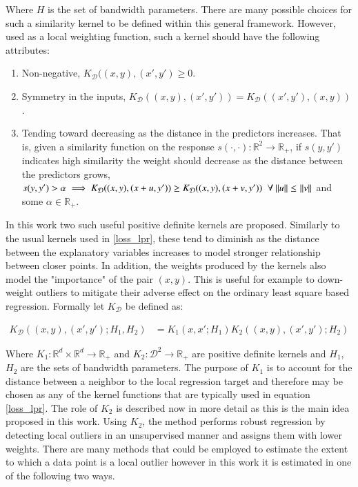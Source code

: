 \documentclass[preprint,1p,times]{elsarticle}
\begin{document}
Where $H$ is the set of bandwidth parameters. There are many possible choices for such a similarity kernel to be defined within this general framework. However, used as a local weighting function, such a kernel should have the following attributes:
\begin{enumerate}
\item Non-negative, $K_{\mathcal{D}}((x,y) , ( x', y') \geq 0$.
\item Symmetry in the inputs, $K_{\mathcal{D}}((x,y) , ( x', y')) = K_{\mathcal{D}}((x', y') , (x,y))$.
\item Tending toward decreasing as the distance in the predictors increases. That is, given  a similarity function on the response $s(\cdot, \cdot): \mathbb{R}^2 \rightarrow \mathbb{R}_+$, if $s(y, y')$ indicates high similarity the weight should decrease as the distance between the predictors grows, $s(y, y') > \alpha \implies       
K_{\mathcal{D}}((x, y) , ( x + u, y')) \geq K_{\mathcal{D}}((x, y) , (x + v, y')) \; \; \forall \: \norm{u} \leq \: \norm{v}$ and some $\alpha \in \mathbb{R}_+$.
\end{enumerate}

In this work two such useful positive definite kernels are proposed. Similarly to the usual kernels used in \eqref{loss_lpr}, these tend to diminish as the distance between the explanatory variables increases to model stronger relationship between closer points. In addition, the weights produced by the kernels also model the "importance" of the pair $(x,y)$. This is useful for example to down-weight outliers to mitigate their adverse effect on the ordinary least square based regression. Formally let $K_{\mathcal{D}}$ be defined as:

\begin{align}
K_{\mathcal{D}} \left((x,y),(x', y') ; H_1, H_2 \right) &= K_1(x,x' ; H_1) K_2 \left((x,y),(x', y') ; H_2 \right)
\label{compound_kernel_def}
\end{align}

Where $K_1: \mathbb{R}^d \times \mathbb{R}^d \rightarrow \mathbb{R}_+$ and $K_2: \mathcal{D}^2 \rightarrow \mathbb{R}_+$ are positive definite kernels and $H_1$, $H_2$ are the sets of bandwidth parameters. The purpose of $K_1$ is to account for the distance between a neighbor to the local regression target and therefore may be chosen as any of the kernel functions that are typically used in equation \eqref{loss_lpr}. The role of $K_2$ is described now in more detail as this is the main idea proposed in this work. Using $K_2$, the method performs robust regression by detecting local outliers in an unsupervised manner and assigns them with lower weights. There are many methods that could be employed to estimate the extent to which a data point is a local outlier however in this work it is estimated in one of the following two ways.
\end{document}

